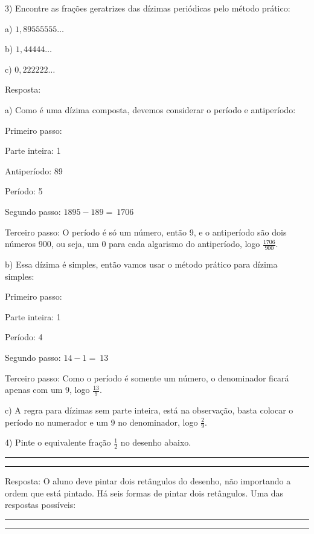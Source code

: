 {{{3) Encontre as frações geratrizes das dízimas periódicas pelo método
prático:

a) \(1,89555555\ldots\)

b) \(1,44444\ldots\)

c) \(0,222222\ldots\)

Resposta:

a) Como é uma dízima composta, devemos considerar o período e
antiperíodo:

Primeiro passo:

Parte inteira: 1

Antiperíodo: 89

Período: 5

Segundo passo: \(1895 - 189 = \ 1706\)

Terceiro passo: O período é só um número, então 9, e o antiperíodo são
dois números 900, ou seja, um 0 para cada algarismo do antiperíodo, logo
\(\frac{1706}{900}\).

b) Essa dízima é simples, então vamos usar o método prático para dízima
simples:

Primeiro passo:

Parte inteira: 1

Período: 4

Segundo passo: \(14 - 1 = \ 13\)

Terceiro passo: Como o período é somente um número, o denominador ficará
apenas com um 9, logo \(\frac{13}{9}\).

c) A regra para dízimas sem parte inteira, está na observação, basta
colocar o período no numerador e um 9 no denominador, logo
\(\frac{2}{9}\).

4) Pinte o equivalente fração \(\frac{1}{2}\) no desenho abaixo.

\begin{center}\rule{0.5\linewidth}{0.5pt}\end{center}

\begin{center}\rule{0.5\linewidth}{0.5pt}\end{center}

Resposta: O aluno deve pintar dois retângulos do desenho, não importando
a ordem que está pintado. Há seis formas de pintar dois retângulos. Uma
das respostas possíveis:

\begin{center}\rule{0.5\linewidth}{0.5pt}\end{center}

\begin{center}\rule{0.5\linewidth}{0.5pt}\end{center}

}}}
